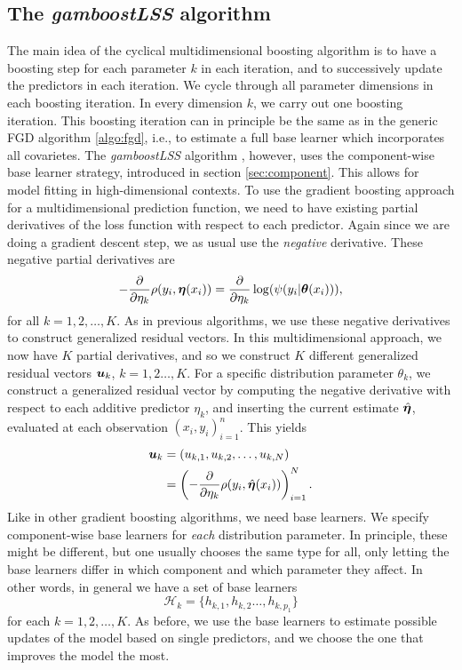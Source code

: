 \subsection{The \textit{gamboostLSS} algorithm}
The main idea of the cyclical multidimensional boosting algorithm is to have a boosting step for each parameter $k$ in each iteration, and to successively update the predictors in each iteration.
We cycle through all parameter dimensions in each boosting iteration.
In every dimension $k$, we carry out one boosting iteration.
This boosting iteration can in principle be the same as in the generic FGD algorithm \eqref{algo:fgd}, i.e., to estimate a full base learner which incorporates all covarietes.
The \textit{gamboostLSS} algorithm \citep{gamboostlss-paper}, however, uses the component-wise base learner strategy, introduced in section \ref{sec:component}.
This allows for model fitting in high-dimensional contexts.
To use the gradient boosting approach for a multidimensional prediction function, we need to have existing partial derivatives of the loss function with respect to each predictor.
Again since we are doing a gradient descent step, we as usual use the \textit{negative} derivative.
These negative partial derivatives are
\begin{equation*}
    -\frac{\partial}{\partial\eta_k}\rho(y_i,\boldsymbol{\eta}(x_i))=\frac{\partial}{\partial\eta_k}\log(\psi(y_i|\boldsymbol{\theta}(x_i))),
\end{equation*}
for all $k=1,2,\ldots,K$.
As in previous algorithms, we use these negative derivatives to construct generalized residual vectors.
In this multidimensional approach, we now have $K$ partial derivatives, and so we construct $K$ different generalized residual vectors $\bm{u}_k$, $k=1,2\ldots,K$.
For a specific distribution parameter $\theta_k$, we construct a generalized residual vector by computing the negative derivative with respect to each additive predictor $\eta_k$, and inserting the current estimate $\hat{\boldsymbol{\eta}}$, evaluated at each observation $(x_i,y_i)_{i=1}^n$.
This yields
\begin{align*}
    \bm{u}_k&=(u_{k,1},u_{k,2},\ldots,u_{k,N})\\
    &=\left(-\frac{\partial}{\partial \eta_k}\rho(y_i,\hat{\boldsymbol{\eta}}(x_i))\right)_{i=1}^N.
\end{align*}
Like in other gradient boosting algorithms, we need base learners.
We specify component-wise base learners for \textit{each} distribution parameter.
In principle, these might be different, but one usually chooses the same type for all, only letting the base learners differ in which component and which parameter they affect.
In other words, in general we have a set of base learners
\begin{equation*}
    \mathcal{H}_{k}=\{h_{k,1},h_{k,2}\ldots,h_{k,p_1}\}
\end{equation*}
for each $k=1,2,\ldots,K$.
As before, we use the base learners to estimate possible updates of the model based on single predictors, and we choose the one that improves the model the most.

